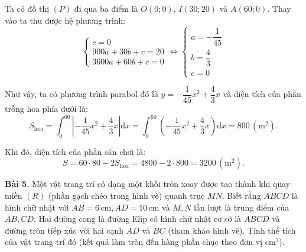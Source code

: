 Ta có đồ thị $(P)$ đi qua ba điểm là $O(0; 0)$, $I(30; 20)$ và $A(60; 0)$. Thay vào ta thu được hệ phương trình:
\[
\begin{cases}
c = 0 \\
900a + 30b + c = 20 \\
3600a + 60b + c = 0
\end{cases}
\iff
\begin{cases}
a = -\dfrac{1}{45} \\[6pt]
b = \dfrac{4}{3} \\[6pt]
c = 0
\end{cases}
\]

Như vậy, ta có phương trình parabol đó là $y = -\dfrac{1}{45}x^2 + \dfrac{4}{3}x$ và diện tích của phần trồng hoa phía dưới là:
\[
S_{\text{hoa}} = \int_{0}^{60} \left| -\frac{1}{45}x^2 + \frac{4}{3}x \right| \mathrm{d}x = \int_{0}^{60} \left(-\frac{1}{45}x^2 + \frac{4}{3}x\right) \mathrm{d}x = 800 \, (\text{m}^2).
\]

Khi đó, diện tích của phần sân chơi là:
\[
S = 60 \cdot 80 - 2S_{\text{hoa}} = 4800 - 2 \cdot 800 = 3200 \, (\text{m}^2).
\]

\noindent\textbf{Bài 5.} Một vật trang trí có dạng một khối tròn xoay được tạo thành khi quay miền $(R)$ (phần gạch chéo trong hình vẽ) quanh trục $MN$. Biết rằng $ABCD$ là hình chữ nhật với $AB = 6\,\text{cm}, AD = 10\,\text{cm}$ và $M, N$ lần lượt là trung điểm của $AB, CD$. Hai đường cong là đường Elip có hình chữ nhật cơ sở là $ABCD$ và đường tròn tiếp xúc với hai cạnh $AD$ và $BC$ (tham khảo hình vẽ). Tính thể tích của vật trang trí đó (kết quả làm tròn đến hàng phần chục theo đơn vị $\text{cm}^3$).

